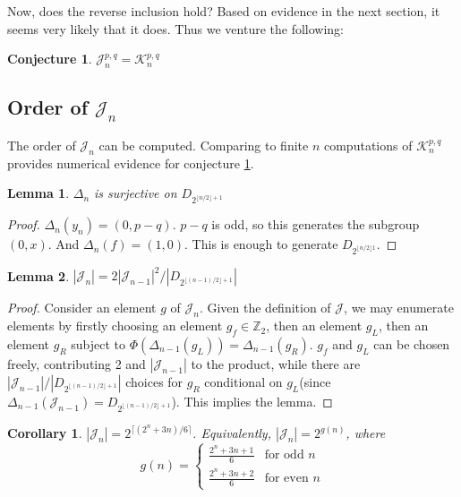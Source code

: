 \documentclass[11pt]{article}
\theoremstyle{plain}
\newtheorem{lemma}{Lemma}
\newtheorem{corollary}{Corollary}
\newtheorem{conjecture}{Conjecture}
\theoremstyle{definition}
\begin{document}
Now, does the reverse inclusion hold? Based on evidence in the next section, it seems very likely that it does. Thus we venture the following:

\begin{conjecture}\label{conj}
    $\mathcal{J}_n^{p,q} = \mathcal{K}_n^{p,q}$
\end{conjecture}
    
\subsection{Order of $\mathcal{J}_n$}

The order of $\mathcal{J}_n$ can be computed. Comparing to finite $n$ computations of $\mathcal{K}_n^{p,q}$ provides numerical evidence for conjecture \ref{conj}.

\begin{lemma}
$\Delta_{n}$ is surjective on $D_{2^{\lfloor n/2 \rfloor + 1}}$
\end{lemma}

\begin{proof}
    $\Delta_n(y_n) = (0,p-q)$. $p-q$ is odd, so this generates the subgroup $(0,x)$. And $\Delta_n(f) = (1,0)$. This is enough to generate $D_{2^{\lfloor n/2 \rfloor 1}}$.
\end{proof}

\begin{lemma}
    $|\mathcal{J}_n| = 2|\mathcal{J}_{n-1}|^2/|D_{2^{\lfloor(n-1)/2 \rfloor+1}}|$
\end{lemma}

\begin{proof}
Consider an element $g$ of $\mathcal{J}_n$. Given the definition of $\mathcal{J}$, we may enumerate elements by firstly choosing an element $g_f \in \mathbb{Z}_2$, then an element $g_L$, then an element $g_R$ subject to $\Phi(\Delta_{n-1}(g_L)) = \Delta_{n-1}(g_R)$. $g_f$ and $g_L$ can be chosen freely, contributing 2 and $|\mathcal{J}_{n-1}|$ to the product, while there are  $|\mathcal{J}_{n-1}|/|D_{2^{\lfloor(n-1)/2 \rfloor+1}}|$ choices for $g_R$ conditional on $g_L$(since $\Delta_{n-1}(\mathcal{J}_{n-1}) = D_{2^{\lfloor(n-1)/2 \rfloor+1}}$). This implies the lemma.

    
\end{proof}


\begin{corollary}
    $|\mathcal{J}_n| = 2^{\lceil(2^n+3n)/6\rceil}$. Equivalently, $|\mathcal{J}_n| = 2^{g(n)}$, where $$g(n) = \begin{cases}
        \frac{2^n + 3n + 1}{6} & \text{for odd $n$} \\
        \frac{2^n + 3n + 2}{6} & \text{for even $n$}
    \end{cases}$$
    \end{corollary}
\end{document}
